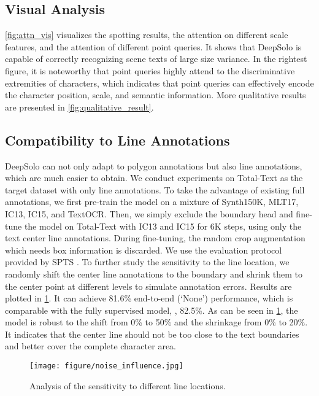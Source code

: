 \documentclass[10pt,twocolumn,letterpaper]{article}
\begin{document}
\subsection{Visual Analysis}
\cref{fig:attn_vis} visualizes the spotting results, the attention on different scale features, and the attention of different point queries. It shows that DeepSolo is capable of correctly recognizing scene texts of large size variance. 
In the rightest figure, it is noteworthy that point queries highly attend to the discriminative extremities of characters, which indicates that point queries can effectively encode the character position, scale, and semantic information. More qualitative results are presented in \cref{fig:qualitative_result}.

\subsection{Compatibility to Line Annotations}
DeepSolo can not only adapt to polygon annotations but also line annotations, which are much easier to obtain. We conduct experiments on Total-Text as the target dataset with only line annotations. To take the advantage of existing full annotations, we first pre-train the model on a mixture of Synth150K, MLT17, IC13, IC15, and TextOCR. Then, we simply exclude the boundary head and fine-tune the model on Total-Text with IC13 and IC15 for 6K steps, using only the text center line annotations. During fine-tuning, the random crop augmentation which needs box information is discarded. We use the evaluation protocol provided by SPTS \cite{peng2022spts}. To further study the sensitivity to the line location, we randomly shift the center line annotations to the boundary and shrink them to the center point at different levels to simulate annotation errors. Results are plotted in \cref{fig:noise_analysis}. It can achieve 81.6\% end-to-end (‘None') performance, which is comparable with the fully supervised model, \ie, 82.5\%. As can be seen in \cref{fig:noise_analysis}, the model is robust to the shift from 0\% to 50\% and the shrinkage from 0\% to 20\%. It indicates that the center line should not be too close to the text boundaries and better cover the complete character area. 

\begin{figure}[!t]
    \centering
    \texttt{[image: figure/noise\_influence.jpg]}
    \caption{Analysis of the sensitivity to different line locations.}
    \label{fig:noise_analysis}
\end{figure}
\end{document}
